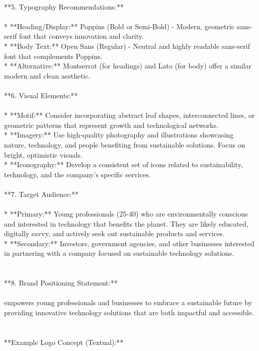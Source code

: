 \documentclass[a4paper,11pt]{article}
\begin{document}
{\\
**5. Typography Recommendations:**\\
\\
* **Heading/Display:** Poppins (Bold or Semi-Bold) - Modern, geometric sans-serif font that conveys innovation and clarity.\\
* **Body Text:** Open Sans (Regular) - Neutral and highly readable sans-serif font that complements Poppins.\\
* **Alternative:** Montserrat (for headings) and Lato (for body) offer a similar modern and clean aesthetic.\\
\\
**6. Visual Elements:**\\
\\
* **Motif:**  Consider incorporating abstract leaf shapes, interconnected lines, or geometric patterns that represent growth and technological networks.\\
* **Imagery:**  Use high-quality photography and illustrations showcasing nature, technology, and people benefiting from sustainable solutions.  Focus on bright, optimistic visuals.\\
* **Iconography:**  Develop a consistent set of icons related to sustainability, technology, and the company’s specific services.\\
\\
**7. Target Audience:**\\
\\
* **Primary:** Young professionals (25-40) who are environmentally conscious and interested in technology that benefits the planet.  They are likely educated, digitally savvy, and actively seek out sustainable products and services.\\
* **Secondary:**  Investors, government agencies, and other businesses interested in partnering with a company focused on sustainable technology solutions.\\
\\
\\
**8. Brand Positioning Statement:**\\
\\
[Brand Name] empowers young professionals and businesses to embrace a sustainable future by providing innovative technology solutions that are both impactful and accessible.\\
\\
\\
**Example Logo Concept (Textual):**\\
\\
}
\end{document}
